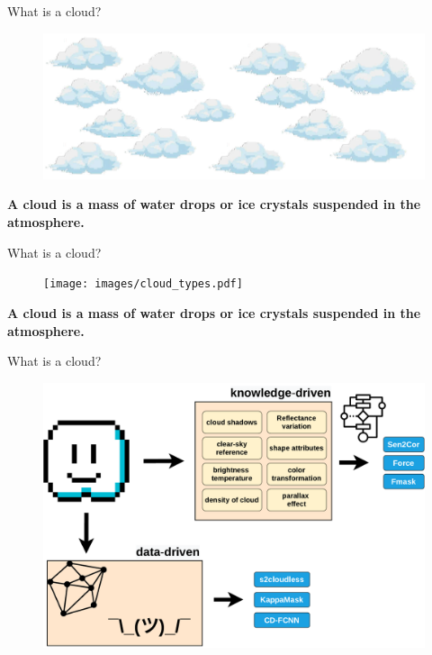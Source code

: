 \begin{frame}{What is a cloud?}
	\begin{center}
		\begin{figure}
			\centering
			\includegraphics[width=0.8\linewidth]{images/intro_fig00_0.png}
			\label{fig:introfig01}
	\end{figure}
	\vspace{20px}
	\textbf{A cloud is a mass of water drops or ice crystals suspended in the atmosphere.}	
	\end{center}
\end{frame}


\begin{frame}{What is a cloud?}
	\begin{center}
		\begin{figure}
			\centering
			\texttt{[image: images/cloud\_types.pdf]}
			\label{fig:introfig01}
		\end{figure}
		\textbf{A cloud is a mass of water drops or ice crystals suspended in the atmosphere.}	
	\end{center}
\end{frame}


\begin{frame}{What is a cloud?}
	\begin{center}
		\begin{figure}
			\centering
			\includegraphics[width=0.85\linewidth]{images/intro_what_is_a_cloud.pdf}
			\label{fig:introfig01}
		\end{figure}
	\end{center}
\end{frame}



